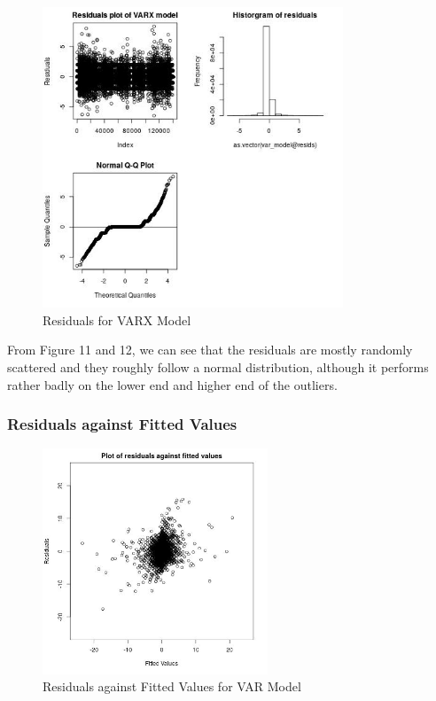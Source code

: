 \documentclass[12pt, letterpaper] {article}
\begin{document}
\begin{figure}[H]
    \centering
    \includegraphics[width=0.8\textwidth, height=0.42\textheight]{Images/Full_VARX_diff_resids.jpg}
    \caption{Residuals for VARX Model}
    \label{fig:Residuals for VARX Model}
\end{figure}

From Figure 11 and 12, we can see that the residuals are mostly randomly scattered and they roughly follow a normal distribution, although it performs rather badly on the lower end and higher end of the outliers. 


\subsubsection{Residuals against Fitted Values}

\begin{figure}[H]
    \centering
    \includegraphics[width=0.6\textwidth, height=0.3\textheight]{Images/Full_VAR_diff_resids_vs_values.jpg}
    \caption{Residuals against Fitted Values for VAR Model}
    \label{fig:Residuals against Fitted Values for VAR Model}
\end{figure}
\end{document}
